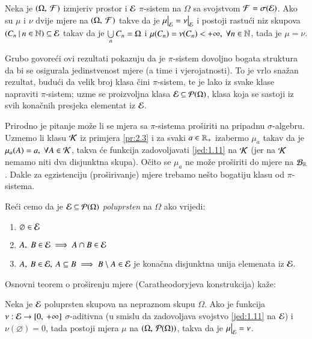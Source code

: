 \begin{zad} \label{zad:2.9}
    Neka je $(\Omega, \: \mathcal{F})$ izmjeriv prostor i $\mathcal{E}$ $\pi$-sistem na $\Omega$ sa svojstvom $\mathcal{F} = \sigma({\mathcal{E}})$.
    Ako su $\mu$ i $\nu$ dvije mjere na $(\Omega, \: \mathcal{F})$ takve da je $\restr{\mu}{\famE} = \restr{\nu}{\famE}$ i postoji rastu\' ci niz skupova $({C_n} \: | \: {n \in \mathbb{N}}) \subseteq \mathcal{E}$ takav da je $\bigcup\limits_{n}^{}C_n = \Omega$ i $\mu({C_n}) = \nu(C_n) < +\infty, \;
    \forall n \in \mathbb{N}$, tada je $\mu = \nu$.
\end{zad}

\begin{nap} \label{nap:2.10}
    Grubo govore\' ci ovi rezultati pokazuju da je $\pi$-sistem dovoljno bogata struktura da bi se osigurala jedinstvenost mjere (a time i vjerojatnosti).
    To je vrlo sna\v zan rezultat, budu\' ci da velik broj klasa \v cini $\pi$-sistem, te je lako iz svake klase napraviti $\pi$-sistem; uzme se proizvoljna klasa $\mathcal{E} \subseteq \mathcal{P}({\Omega})$, klasa koja se sastoji iz svih kona\v cnih presjeka elementat iz $\mathcal{E}$.

    Prirodno je pitanje mo\v ze li se mjera sa $\pi$-sistema pro\v siriti na pripadnu $\sigma$-algebru.
    Uzmemo li klasu $\mathcal{K}$ iz primjera \ref{pr:2.3} i za svaki $a \in \mathbb{R}_+$ izabermo $\mu_a$ takav da je $\mu_a(A) = a, \; \forall A \in \mathcal{K}$, takva \' ce funkcija zadovoljavati \eqref{jed:1.11} na $\mathcal{K}$ (jer na $\mathcal{K}$ nemamo niti dva disjunktna skupa).
    O\v cito se $\mu_a$ ne mo\v ze pro\v siriti do mjere na $\mathcal{B}_{\mathbb{R}}$.
    Dakle za egzistenciju  (pro\v sirivanje) mjere trebamo ne\v sto bogatiju klasu od $\pi$-sistema.
\end{nap}

Re\' ci cemo da je $\mathcal{E} \subseteq \mathcal{P}({\Omega})$ \emph{poluprsten}
na $\Omega$ ako vrijedi:
\begin{enumerate}[label=(\roman*)]
    \item $\varnothing \in \mathcal{E}$
    \item $A, \; B \in \mathcal{E} \implies A \cap B \in \mathcal{E}$
    \item $A, \: B \in \mathcal{E}, \: A \subseteq B \implies B \setminus
        A \in \mathcal{E}$ je kona\v cna disjunktna unija elemenata iz $\mathcal{E}$.
\end{enumerate}

Osnovni teorem o pro\v sirenju mjere (Caratheodoryjeva konstrukcija) ka\v ze:

\begin{tm}  \label{tm:2.11}
    Neka je $\mathcal{E}$ poluprsten skupova na nepraznom skupu $\Omega$. Ako je funkcija $\nu: \mathcal{E} \to [0, \: + \infty]$ $\sigma$-aditivna (u smislu da zadovoljava svojstvo \eqref{jed:1.11} na $\mathcal{E}$) i $\nu(\varnothing) = 0$, tada postoji mjera $\mu$ na $(\Omega, \: \mathcal{P}({\Omega}))$, takva da je $\restr{\mu}{\famE} = \nu$.
\end{tm}


